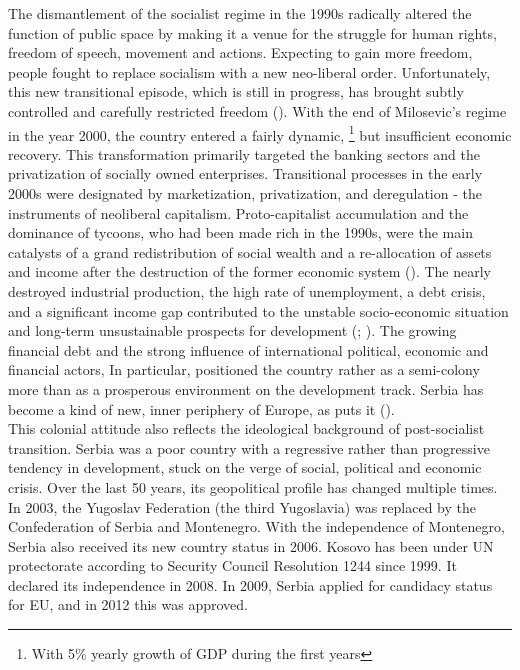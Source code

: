 \documentclass[11pt]{report}
\begin{document}
{{{{The dismantlement of the socialist regime in the 1990s radically altered the function of public space by making it a venue for the struggle for human rights, freedom of speech, movement and actions. Expecting to gain more freedom, people fought to replace socialism with a new neo-liberal order. Unfortunately, this new transitional episode, which is still in progress, has brought subtly controlled and carefully restricted freedom
(\href{Cvetinovic}{\citealt{bolay_instrumental_2014}}).
With the end of Milosevic's regime in the year 2000, the country entered a fairly dynamic,
\footnote{With 5\%  yearly growth of GDP during the first years}
but insufficient economic recovery.
This transformation primarily targeted the banking sectors and the privatization of socially owned enterprises. Transitional processes in the early 2000s were designated by marketization, privatization, and deregulation - the instruments of neoliberal capitalism. Proto-capitalist accumulation and the dominance of tycoons, who had been made rich in the 1990s, were the main catalysts of a grand redistribution of social wealth and a re-allocation of assets and income after the destruction of the former economic system (\href{Vujosevic}{\citealt{vujosevic_collapse_2010}}).
The nearly destroyed industrial production, the high rate of unemployment, a debt crisis, and a significant income gap contributed to the unstable socio-economic situation and long-term unsustainable prospects for development (\href{Vujosevic}{\citealt{vujosevic_postsocijalisticka_2010}}; \href{Vujosevic}{\citealt{vujosevic_novi_2012}}).
The growing financial debt and the strong influence of international political, economic and financial actors, In particular, positioned the country rather as a semi-colony more than as a prosperous environment on the development track.  
Serbia has become a kind of new, inner periphery of Europe, as
\href{Göler}{\cite{goeler_south-east_2004}} puts it (\href{Vujosevic}{\citealt{vujosevic_post-socialist_2012}}).
\\ 
    
This colonial attitude also reflects the ideological background of post-socialist transition. Serbia was a poor country with a regressive rather than progressive tendency in development, stuck on the verge of social, political and economic crisis. Over the last 50 years, its geopolitical profile has changed multiple times. In 2003, the Yugoslav Federation (the third Yugoslavia) was replaced by the Confederation of Serbia and Montenegro. With the independence of Montenegro, Serbia also received its new country status in 2006. Kosovo has been under UN protectorate according to Security Council Resolution 1244 since 1999. It declared its independence in 2008. In 2009, Serbia applied for candidacy status for EU, and in 2012 this was approved. 
\\

}}}}
\end{document}
